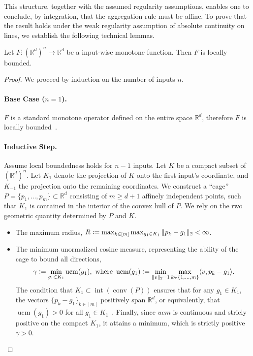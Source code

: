 \documentclass[twoside,11pt]{article}
\begin{document}
This structure, together with the assumed regularity assumptions, enables one to conclude, by integration, that the aggregation rule must be affine.
To prove that the result holds under the weak regularity assumption of absolute continuity on lines, we establish the following technical lemmas.
\begin{lemma}\label{lem:wwmonotone-localintegrability}
Let $F: (\mathbb{R}^d)^n \to \mathbb{R}^d$ be a input-wise monotone function. Then $F$ is locally bounded.
\end{lemma}
\begin{proof}
We proceed by induction on the number of inputs $n$.

\paragraph{Base Case ($n=1$).}
$F$ is a standard monotone operator defined on the entire space $\mathbb{R}^d$, therefore $F$ is locally bounded~\citep[Theorem 2]{Borwein1989LocalBO}.

\paragraph{Inductive Step.}
Assume local boundedness holds for $n-1$ inputs.
Let $K$ be a compact subset of $(\mathbb{R}^d)^n$. 
Let $K_1$ denote the projection of $K$ onto the first input's coordinate, and $K_{-1}$ the projection onto the remaining coordinates.
We construct a ``cage''  $P = \{p_1, \dots, p_m\} \subset \mathbb{R}^d$ consisting of $m\geq d+1$ affinely independent points, such that $K_1$ is contained in the interior of the convex hull of $P$.
We rely on the rwo geometric quantity determined by $P$ and $K$.
\begin{itemize}
  \item The maximum radius, $R \vcentcolon= \max_{k\in[m]} \max_{g_1 \in K_1} \|p_k - g_1\|_2 < \infty$.
  \item The minimum unormalized cosine measure, representing the ability of the cage to bound all directions,
  \[ 
    \gamma \vcentcolon= \min_{g_{1} \in K_1} \operatorname{ucm}(g_1), \text{ where } \operatorname{ucm}(g_1) \vcentcolon= \min_{\|v\|_2=1} \max_{k \in \{1,\dots,m\}} \langle v, p_k - g_1 \rangle. 
  \]
  The condition that $K_1 \subset \operatorname{int}(\operatorname{conv}(P))$ ensures that for any $g_1 \in K_1$, the vectors $\{p_k - g_1\}_{k \in [m]}$ positively span $\mathbb{R}^d$, or equivalently, that $\operatorname{ucm}(g_1) > 0$ for all $g_1 \in K_1$~\citep[Theorem 2.3]{conn2009introduction}.
  Finally, since $ucm$ is continuous and stricly positive on the compact $K_1$, it attains a minimum, which is strictly positive $\gamma > 0$.
\end{itemize}


\end{proof}
\end{document}
